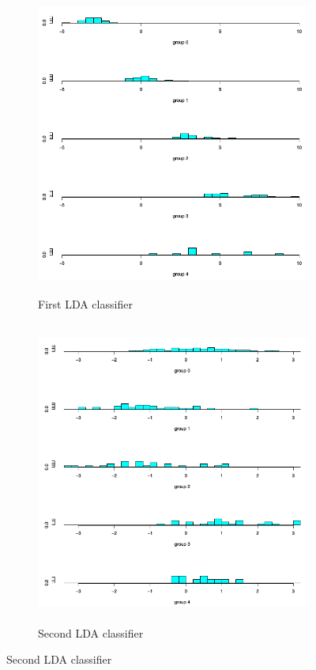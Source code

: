 \documentclass[a4paper]{article}
\begin{document}
\begin{figure}[H]
	\begin{subfigure}{0.5\textwidth}
		\caption{First LDA classifier}
		\includegraphics[width=0.9\linewidth, height=10cm]{Q4_pics/Clev-Hist1.png}
	\end{subfigure}
	\begin{subfigure}{0.5\textwidth}
		\caption{Second LDA classifier}
		\includegraphics[width=0.9\linewidth, height=10cm]{Q4_pics/Clev-Hist2.png}
	\end{subfigure}


\end{figure}
\end{document}
